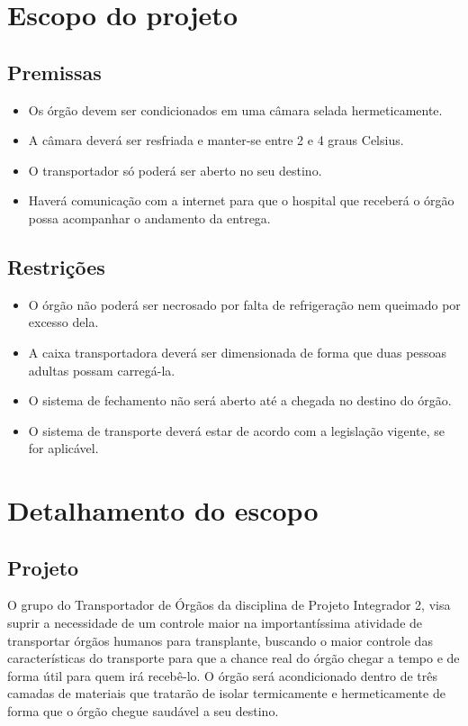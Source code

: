 \section{Escopo do projeto}
 \subsection{Premissas}
  \begin{itemize}
    \item Os órgão devem ser condicionados em uma câmara selada hermeticamente.
    \item A câmara deverá ser resfriada e manter-se entre 2 e 4 graus Celsius.
    \item O transportador só poderá ser aberto no seu destino.
    \item Haverá comunicação com a internet para que o hospital que receberá o órgão possa acompanhar o andamento da entrega.
  \end{itemize}

  \subsection{Restrições}
  \begin{itemize}
    \item O órgão não poderá ser necrosado por falta de refrigeração nem queimado por excesso dela.
    \item A caixa transportadora deverá ser dimensionada de forma que duas pessoas adultas possam carregá-la.
    \item O sistema de fechamento não será aberto até a chegada no destino do órgão.
    \item O sistema de transporte deverá estar de acordo com a legislação vigente, se for aplicável.

  \end{itemize}

\section{Detalhamento do escopo}
  \subsection{Projeto}
  O grupo do Transportador de Órgãos da disciplina de Projeto Integrador 2, visa suprir a necessidade de um controle maior na importantíssima atividade de transportar órgãos humanos para transplante, buscando o maior controle das características do transporte para que a chance real do órgão chegar a tempo e de forma útil para quem irá recebê-lo. O órgão será acondicionado dentro de três camadas de materiais que tratarão de isolar termicamente e hermeticamente de forma que o órgão chegue saudável a seu destino.

